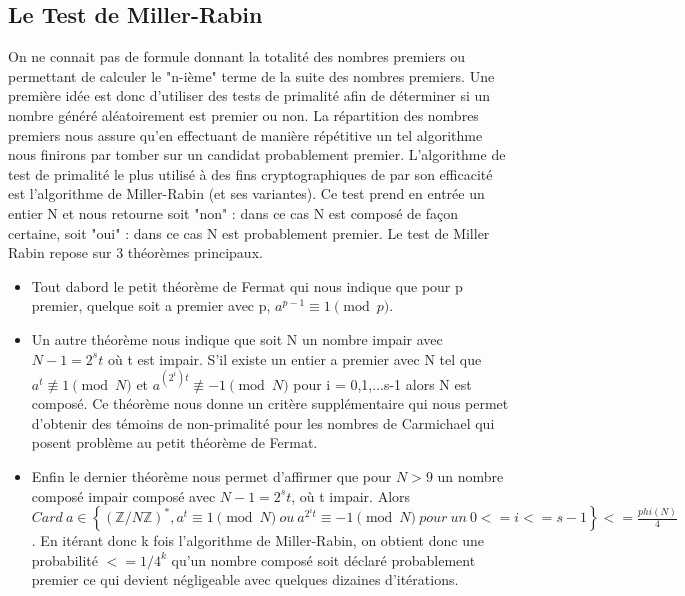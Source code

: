 \documentclass{article}
\begin{document}
\subsection{Le Test de Miller-Rabin}


On ne connait pas de formule donnant la totalité des nombres premiers ou permettant de calculer le "n-ième" terme de la suite des nombres premiers. Une première idée est donc d'utiliser des tests de primalité afin de déterminer si un nombre généré aléatoirement est premier ou non. La répartition des nombres premiers nous assure qu'en effectuant de manière répétitive un tel algorithme nous finirons par tomber sur un candidat probablement premier. \newline
L'algorithme de test de primalité le plus utilisé à des fins cryptographiques de par son efficacité  est l'algorithme de Miller-Rabin (et ses variantes). Ce test  prend en entrée un entier N et nous retourne soit "non" : dans ce cas N est composé de façon certaine, soit "oui" : dans ce cas N est probablement premier. \newline
Le test de Miller Rabin repose sur 3 théorèmes
principaux. \newline
\begin{itemize}
\item Tout dabord le petit théorème de Fermat qui nous indique que pour p premier, quelque soit a premier avec p, $a^{p-1} \equiv 1 \pmod p$. \newline

\item Un autre théorème nous indique que soit N un nombre impair avec $N-1 = 2^{s}t$ où t est impair. S'il existe un entier a premier avec N tel que $a^t  \not\equiv 1 \pmod N$ et $a^{(2^i)t} \not\equiv -1 \pmod N$ pour i = 0,1,...s-1 alors N est composé. Ce théorème nous donne un critère supplémentaire qui nous permet d'obtenir des témoins de non-primalité pour les nombres de Carmichael qui posent problème au petit théorème de Fermat. \newline

\item Enfin le dernier théorème nous permet d'affirmer que pour $N > 9$ un nombre composé impair composé avec $N-1 = 2^{s}t$, où t impair. Alors $Card~a \in \left\{(\mathbb{Z}/N\mathbb{Z})^*, a^t \equiv 1 \pmod N~ou~ a^{2^{i}t} \equiv -1 \pmod N~pour~un~0<=i<=s-1\right\} <= \frac{phi(N)}{4}$. En itérant donc k fois l'algorithme de Miller-Rabin, on obtient donc une probabilité $<= 1/4^k$ qu'un nombre composé soit déclaré probablement premier ce qui devient négligeable avec quelques dizaines d'itérations.\newline
\end{itemize} 
\end{document}
